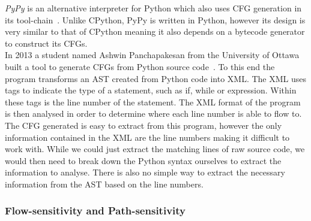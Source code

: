 \documentclass[12pt, titlepage]{article}
\begin{document}
\indent \textit{PyPy} is an alternative interpreter for Python which also uses CFG generation in its tool-chain~\cite{pypyCFG}. Unlike CPython, PyPy is written in Python, however its design is very similar to that of CPython meaning it also depends on a bytecode generator to construct its CFGs. \\
\indent In 2013 a student named Ashwin Panchapakesan from the University of Ottawa built a tool to generate CFGs from Python source code~\cite{ashwinCFG}. To this end the program transforms an AST created from Python code into XML. The XML uses tags to indicate the type of a statement, such as if, while or expression. Within these tags is the line number of the statement. The XML format of the program is then analysed in order to determine where each line number is able to flow to. The CFG generated is easy to extract from this program, however the only information contained in the XML are the line numbers making it difficult to work with. While we could just extract the matching lines of raw source code, we would then need to break down the Python syntax ourselves to extract the information to analyse. There is also no simple way to extract the necessary information from the AST based on the line numbers.

\subsubsection{Flow-sensitivity and Path-sensitivity}
\end{document}
